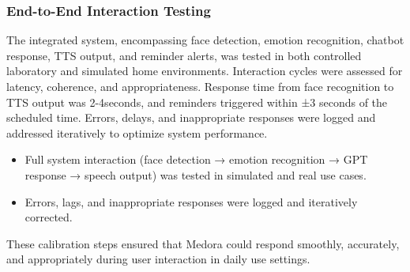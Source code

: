 \subsubsection{ End-to-End Interaction Testing}

The integrated system, encompassing face detection, emotion recognition, chatbot response, TTS output, and reminder alerts, was tested in both controlled laboratory and simulated home environments. Interaction cycles were assessed for latency, coherence, and appropriateness. Response time from face recognition to TTS output was 2-4seconds, and reminders triggered within ±3 seconds of the scheduled time. Errors, delays, and inappropriate responses were logged and addressed iteratively to optimize system performance.

\begin{itemize}
  \item Full system interaction (face detection → emotion recognition → GPT response → speech output) was tested in simulated and real use cases.
  \item Errors, lags, and inappropriate responses were logged and iteratively corrected.
\end{itemize}

These calibration steps ensured that Medora could respond smoothly, accurately, and appropriately during user interaction in daily use settings.

